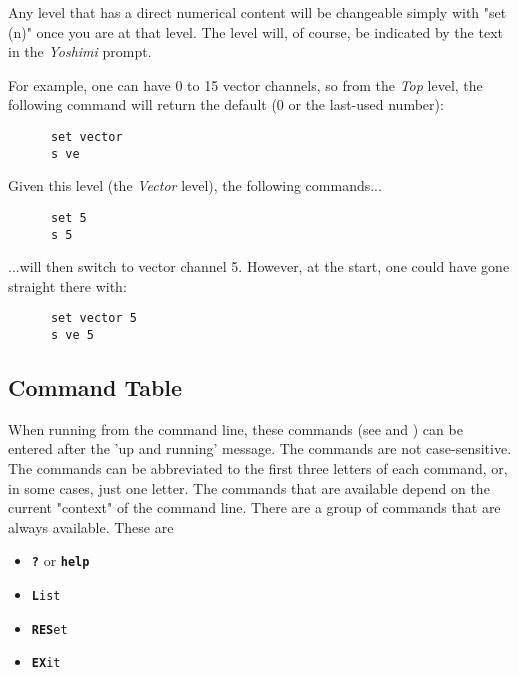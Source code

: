    Any level that has a direct numerical content will be changeable simply with
   "set (n)" once you are at that level.  The level will, of course, be
   indicated by the text in the \textsl{Yoshimi} prompt.

   For example, one can have 0 to 15 vector channels, so from the
   \textsl{Top} level, the following command
   will return the default  (0 or the last-used number):

   \begin{verbatim}
      set vector
      s ve
   \end{verbatim}

   Given this level (the \textsl{Vector} level), the following commands...

   \begin{verbatim}
      set 5 
      s 5
   \end{verbatim}

   ...will then switch to vector channel 5.
   However, at the start, one could have gone straight there with:

   \begin{verbatim}
      set vector 5
      s ve 5
   \end{verbatim}

\subsection{Command Table}
\label{subsec:command_line_command_table}

   When running from the command line, these commands
   (see 
   and )
   can be entered after the 'up and running' message.
   The commands are not case-sensitive.
   The commands can be abbreviated to the first three letters of each command,
   or, in some cases, just one letter.
   The commands that are available depend on the current "context" of the
   command line.
   There are a group of commands that are always available. These are

   \begin{itemize}
      \item \texttt{\textbf{?}} or \texttt{\textbf{help}}
      \item \texttt{\textbf{L}ist}
      \item \texttt{\textbf{RES}et}
      \item \texttt{\textbf{EX}it}
   \end{itemize}

